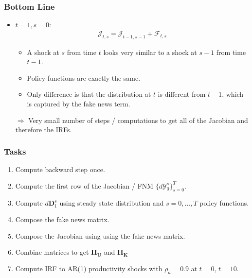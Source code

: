 \documentclass[english,xcolor=svgnames]{beamer}
\begin{document}
\begin{frame}
    \frametitle{Bottom Line}
    \begin{itemize}
        \item $t=1,s=0$:
        \begin{align*}
        	\mathcal{J}_{t,s} = \mathcal{J}_{t-1,s-1} + \mathcal{F}_{t,s} 
        \end{align*}
        \begin{itemize}
        	\item A shock at $s$ from time $t$ looks very similar to a shock at $s-1$ from time $t-1$. 
        	\item Policy functions are exactly the same.
        	\item Only difference is that the distribution at $t$ is different from $t-1$, which is captured by the fake news term. 
        \end{itemize}
       	\item[$\Rightarrow$] Very small number of steps / computations to get all of the Jacobian and therefore the IRFs.
	\end{itemize}
\end{frame}

\begin{frame}
    \frametitle{Tasks}
    \begin{enumerate}
        \item Compute backward step once. 
        \item Compute the first row of the Jacobian / FNM $\{d\mathcal{Y}_0^s\}_{s=0}^T$.
        \item Compute $d\bm{D}_1^s$ using steady state distribution and $s=0,...,T$ policy functions.
        \item Compose the fake news matrix.
        \item Compose the Jacobian using using the fake news matrix.
        \item Combine matrices to get $\mathbf{H}_{\mathbf{U}}$ and $\mathbf{H}_{\mathbf{K}}$
        \item Compute IRF to AR(1) productivity shocks with $\rho_a = 0.9$ at $t=0$, $t=10$.
    \end{enumerate}
\end{frame}
\end{document}
